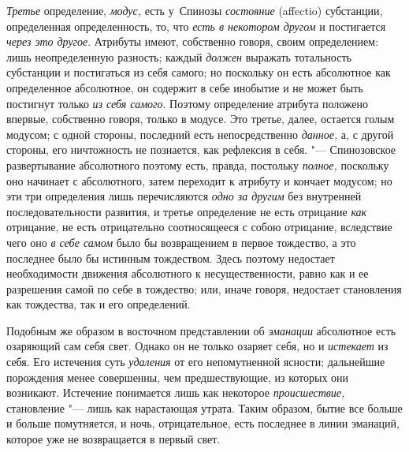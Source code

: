 {\em Третье} определение,
{\em модус,} есть у~Спинозы
{\em состояние} (affectio) субстанции, определенная
определенность, то, что {\em есть в некотором другом} и
постигается {\em через это другое}. Атрибуты имеют,
собственно говоря, своим определением: лишь неопределенную разность; каждый
{\em должен} выражать тотальность субстанции и
постигаться из себя самого; но поскольку он есть абсолютное как
определенное абсолютное, он содержит в себе инобытие и не может быть
постигнут только {\em из себя самого}. Поэтому
определение атрибута положено впервые, собственно говоря, только в модусе.
Это третье, далее, остается голым модусом; с одной стороны, последний есть
непосредственно {\em данное,} а, с другой стороны, его
ничтожность не познается, как рефлексия в себя. "--- Спинозовское
развертывание абсолютного поэтому есть, правда, постольку
{\em полное,} поскольку оно начинает с абсолютного,
затем переходит к атрибуту и кончает модусом; но эти три определения лишь
перечисляются {\em одно за другим} без внутренней
последовательности развития, и третье определение не есть отрицание
{\em как} отрицание, не есть отрицательно соотносящееся
с собою отрицание, вследствие чего оно {\em в себе
самом} было бы возвращением в первое тождество, а это последнее было бы
истинным тождеством. Здесь поэтому недостает необходимости движения
абсолютного к несущественности, равно как и ее разрешения самой по себе в
тождество; или, иначе говоря, недостает становления как тождества, так и
его определений.

Подобным же образом в восточном представлении об
{\em эманации} абсолютное есть озаряющий сам себя свет.
Однако он не только озаряет себя, но и {\em истекает}
из себя. Его истечения суть {\em удаления} от его
непомутненной ясности; дальнейшие порождения менее совершенны, чем
предшествующие, из которых они возникают. Истечение понимается лишь как
некоторое {\em происшествие,} становление "--- лишь как
нарастающая утрата. Таким образом, бытие все больше и больше помутняется, и
ночь, отрицательное, есть последнее в линии эманаций, которое уже не
возвращается в первый свет.

